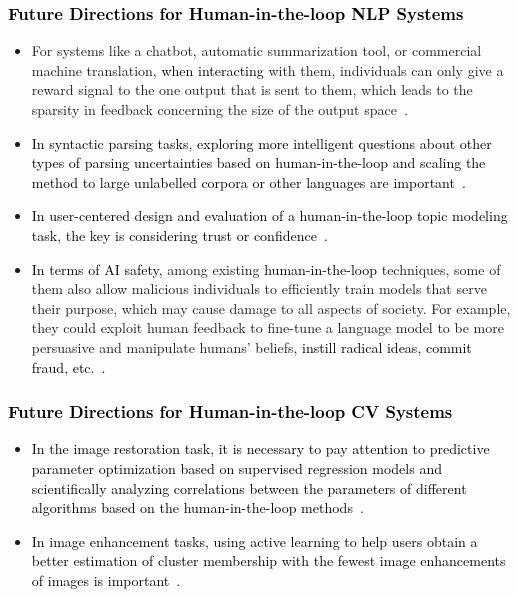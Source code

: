 \documentclass{article}
\newcommand{\p}[1]{\textcolor{black}{#1}}
\newcommand{\REO}[1]{\textcolor{black}{#1}}
\newcommand{\ZJH}[1]{\textcolor{black}{#1}}
\begin{document}
\REO{\subsubsection{Future Directions for Human-in-the-loop NLP Systems}}
\begin{itemize}
\setlength{\itemsep}{0pt}
\setlength{\parsep}{0pt}
\setlength{\parskip}{0pt}
\item
For systems like a chatbot, automatic summarization tool, or commercial machine translation, \ZJH{when interacting} with them, individuals can only give a reward signal to the one output that is sent to them, which leads to the sparsity in feedback concerning the size of the output space~\cite{kreutzer2020learning}.

\item
\REO{
In syntactic parsing tasks, exploring more intelligent questions about other types of parsing uncertainties based on human-in-the-loop and scaling the method to large unlabelled corpora or other languages \ZJH{are} important~\cite{he2016human}.}


\item
\REO{
In user-centered design and evaluation of a \REO{human-in-the-loop} topic modeling task, the key is considering trust or confidence~\cite{smith2018closing}.}

\item
\ZJH{In terms of AI safety,} among existing \ZJH{human-in-the-loop} techniques, some of them also allow malicious individuals to efficiently train models that serve their purpose, which may cause damage to all aspects of society. For example, they could exploit human feedback to fine-tune a language model to be more persuasive and manipulate humans' beliefs, \p{instill radical ideas, commit fraud, etc.~\cite{stiennon2020learning}.}
\end{itemize}


\REO{\subsubsection{Future Directions for Human-in-the-loop CV Systems}}
\begin{itemize}
\setlength{\itemsep}{0pt}
\setlength{\parsep}{0pt}
\setlength{\parskip}{0pt}
\item
\REO{
In the image restoration task, it is necessary to pay attention to predictive parameter optimization based on supervised regression models and scientifically analyzing correlations between the parameters of different algorithms based on the human-in-the-loop methods~\cite{roels2019human}.}


\item
\REO{
In image enhancement tasks, using active learning to help users obtain a better estimation of cluster membership with the fewest image enhancements of images is important~\cite{kapoor2014collaborative}.}
\end{itemize}
\end{document}
